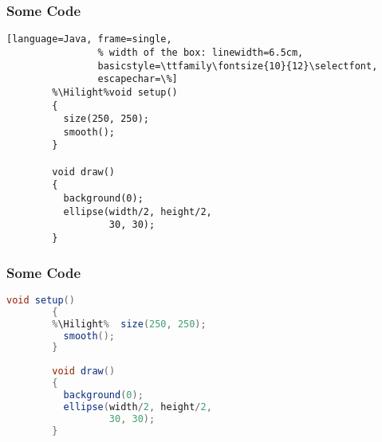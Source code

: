 \documentclass[14pt]{beamer}
\newcommand{\Hilight}{\makebox[0pt][l]{\color{light-gray}\rule[-4pt]{1.0\linewidth}{12pt}}}
\begin{document}



\begin{frame}[fragile]
	\frametitle{Some Code}

	\begin{lstlisting}[language=Java, frame=single,
				% width of the box: linewidth=6.5cm, 
				basicstyle=\ttfamily\fontsize{10}{12}\selectfont,
				escapechar=\%]
		%\Hilight%void setup() 
		{
		  size(250, 250); 
		  smooth();
		}
				
		void draw() 
		{
		  background(0);
		  ellipse(width/2, height/2, 
		          30, 30);
		}		
	\end{lstlisting}	
\end{frame}


\begin{frame}[fragile]
	\frametitle{Some Code}

	\begin{lstlisting}[language=Java, frame=single,
				basicstyle=\ttfamily\fontsize{10}{12}\selectfont,
				escapechar=\%]
		void setup() 
		{
		%\Hilight%  size(250, 250); 
		  smooth();
		}
				
		void draw() 
		{
		  background(0);
		  ellipse(width/2, height/2, 
		          30, 30);
		}		
	\end{lstlisting}	
\end{frame}



\begin{frame}[fragile]
	\frametitle{\MP}
	\begin{figure}[ht]
	\end{figure}
\end{frame}


\end{document}
